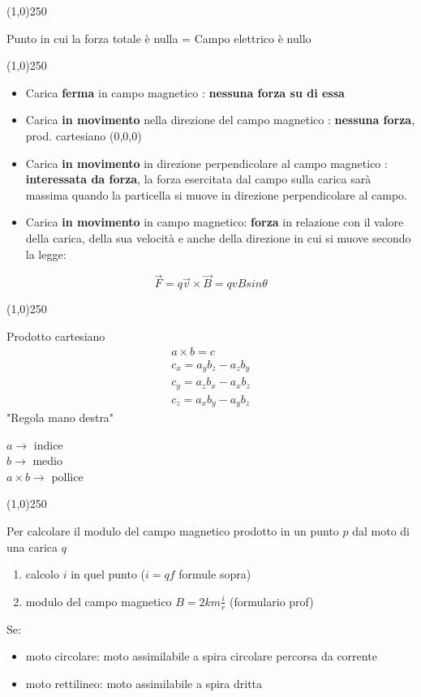 \documentclass[14pt]{extarticle}
\begin{document}
\begin{center}
    \line(1,0){250}
\end{center}
Punto in cui la forza totale è nulla = Campo elettrico è nullo
\begin{center}
    \line(1,0){250}
\end{center}
\begin{itemize}
    \item Carica \textbf{ferma} in campo magnetico : \textbf{nessuna forza su di essa}
    \item Carica \textbf{in movimento} nella direzione del campo magnetico : \textbf{nessuna forza}, prod. cartesiano (0,0,0)
    \item Carica \textbf{in movimento} in direzione perpendicolare al campo magnetico : \textbf{interessata da forza}, la forza esercitata dal campo sulla carica sarà massima 
    quando la particella si muove in direzione perpendicolare al campo.
    \item Carica \textbf{in movimento} in campo magnetico: \textbf{forza} in relazione con il valore della carica, della sua velocità e anche della direzione in cui
    si muove secondo la legge:
\end{itemize}
\begin{equation*}
    \overrightarrow{F}=q\overrightarrow{v}\times\overrightarrow{B}=qvBsin\theta
\end{equation*}

\begin{center}
    \line(1,0){250}
\end{center}
Prodotto cartesiano
\begin{align*}
    a\times b=c\\
    c_x=a_yb_z-a_zb_y\\
    c_y=a_zb_x-a_xb_z\\
    c_z=a_xb_y-a_yb_z
\end{align*}
"Regola mano destra"
\begin{center}
    $a \rightarrow$ indice\\
    $b \rightarrow$ medio\\
    $a\times b \rightarrow$ pollice
\end{center}
\begin{center}
    \line(1,0){250}
\end{center}

Per calcolare il modulo del campo magnetico prodotto in un punto $p$ dal moto di una carica $q$
\begin{enumerate}
    \item calcolo $i$ in quel punto ($i=qf$ formule sopra)
    \item modulo del campo magnetico $B=2km\frac{i}{r}$ (formulario prof) 
\end{enumerate}
Se:
\begin{itemize}
    \item moto circolare: moto assimilabile a spira circolare percorsa da corrente
    \item moto rettilineo: moto assimilabile a spira dritta
\end{itemize}
\end{document}
